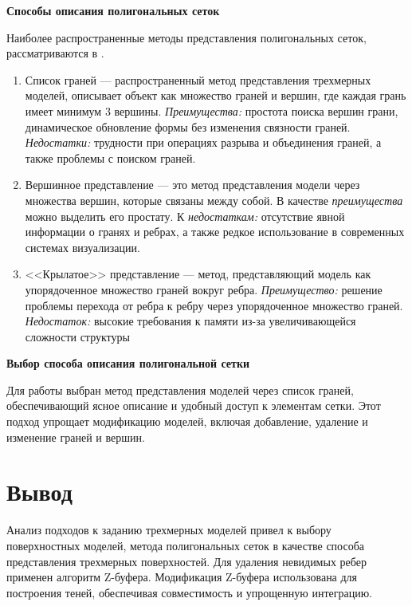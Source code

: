 \textbf{Способы описания полигональных сеток}

Наиболее распространенные методы представления полигональных сеток, рассматриваются в \cite{polygon_mesh}.

\begin{enumerate}
	\item Список граней ---  распространенный метод представления трехмерных моделей, описывает объект как множество граней и вершин, где каждая грань имеет минимум 3 вершины.
	\textit{Преимущества:} простота поиска вершин грани, динамическое обновление формы без изменения связности граней.
	\textit{Недостатки:} трудности при операциях разрыва и объединения граней, а также проблемы с поиском граней.
	
	\item Вершинное представление --- это метод представления модели через множества вершин, которые связаны между собой.
	В качестве \textit{преимущества} можно выделить его простату.
	К \textit{недостаткам:} отсутствие явной информации о гранях и ребрах, а также редкое использование в современных системах визуализации.
	
	\item <<Крылатое>> представление --- метод, представляющий модель как упорядоченное множество граней вокруг ребра.
	\textit{Преимущество:} решение проблемы перехода от ребра к ребру через упорядоченное множество граней.
	\textit{Недостаток:} высокие требования к памяти из-за увеличивающейся сложности структуры
\end{enumerate}


\textbf{Выбор способа описания полигональной сетки} %

Для работы выбран метод представления моделей через список граней, обеспечивающий ясное описание и удобный доступ к элементам сетки. Этот подход упрощает модификацию моделей, включая добавление, удаление и изменение граней и вершин.





\section*{Вывод}

Анализ подходов к заданию трехмерных моделей привел к выбору поверхностных моделей, метода полигональных сеток в качестве способа представления трехмерных поверхностей. Для удаления невидимых ребер применен алгоритм Z-буфера. Модификация Z-буфера использована для построения теней, обеспечивая совместимость и упрощенную интеграцию. 